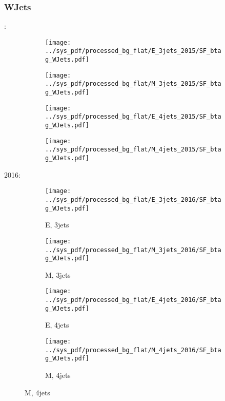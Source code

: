 \documentclass{beamer}
\begin{document}
\begin{frame}
\frametitle{WJets}
\fontsize{5}{1}:
\begin{figure}
\centering
\begin{subfigure}[b]{0.24\textwidth}
\texttt{[image: ../sys\_pdf/processed\_bg\_flat/E\_3jets\_2015/SF\_btag\_WJets.pdf]}
\end{subfigure}
\begin{subfigure}[b]{0.24\textwidth}
\texttt{[image: ../sys\_pdf/processed\_bg\_flat/M\_3jets\_2015/SF\_btag\_WJets.pdf]}
\end{subfigure}
\begin{subfigure}[b]{0.24\textwidth}
\texttt{[image: ../sys\_pdf/processed\_bg\_flat/E\_4jets\_2015/SF\_btag\_WJets.pdf]}
\end{subfigure}
\begin{subfigure}[b]{0.24\textwidth}
\texttt{[image: ../sys\_pdf/processed\_bg\_flat/M\_4jets\_2015/SF\_btag\_WJets.pdf]}
\end{subfigure}
\end{figure}
2016:
\begin{figure}
\centering
\begin{subfigure}[b]{0.24\textwidth}
\texttt{[image: ../sys\_pdf/processed\_bg\_flat/E\_3jets\_2016/SF\_btag\_WJets.pdf]}
\captionsetup{font=tiny}
\caption{E, 3jets}
\end{subfigure}
\begin{subfigure}[b]{0.24\textwidth}
\texttt{[image: ../sys\_pdf/processed\_bg\_flat/M\_3jets\_2016/SF\_btag\_WJets.pdf]}
\captionsetup{font=tiny}
\caption{M, 3jets}
\end{subfigure}
\begin{subfigure}[b]{0.24\textwidth}
\texttt{[image: ../sys\_pdf/processed\_bg\_flat/E\_4jets\_2016/SF\_btag\_WJets.pdf]}
\captionsetup{font=tiny}
\caption{E, 4jets}
\end{subfigure}
\begin{subfigure}[b]{0.24\textwidth}
\texttt{[image: ../sys\_pdf/processed\_bg\_flat/M\_4jets\_2016/SF\_btag\_WJets.pdf]}
\captionsetup{font=tiny}
\caption{M, 4jets}
\end{subfigure}
\end{figure}
\end{frame}
\end{document}
